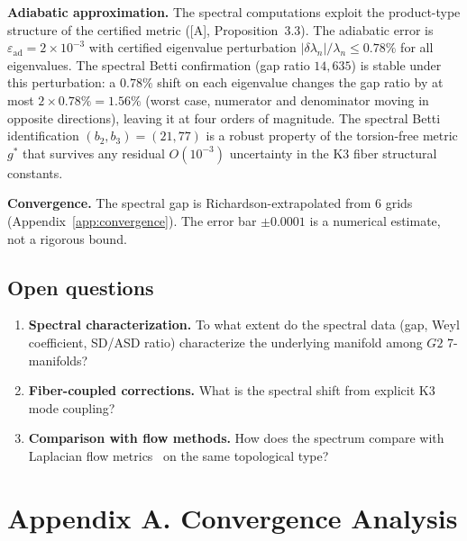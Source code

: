 \documentclass[11pt,a4paper]{article}
\newcommand{\Gtwo}{\mathrm{G}_2}
\def\Gtwo{G2}%
\begin{document}
\textbf{Adiabatic approximation.} The spectral computations exploit the product-type structure of the certified metric ([A], Proposition~3.3). The adiabatic error is $\varepsilon_{\mathrm{ad}} = 2 \times 10^{-3}$ with certified eigenvalue perturbation $|\delta\lambda_n|/\lambda_n \leq 0.78\%$ for all eigenvalues. The spectral Betti confirmation (gap ratio $14{,}635$) is stable under this perturbation: a $0.78\%$ shift on each eigenvalue changes the gap ratio by at most $2 \times 0.78\% = 1.56\%$ (worst case, numerator and denominator moving in opposite directions), leaving it at four orders of magnitude. The spectral Betti identification $(b_2, b_3) = (21, 77)$ is a robust property of the torsion-free metric $g^*$ that survives any residual $O(10^{-3})$ uncertainty in the K3 fiber structural constants.

\textbf{Convergence.} The spectral gap is Richardson-extrapolated from 6 grids (Appendix~\ref{app:convergence}). The error bar $\pm 0.0001$ is a numerical estimate, not a rigorous bound.

\subsection{Open questions}

\begin{enumerate}
\item \textbf{Spectral characterization.} To what extent do the spectral data (gap, Weyl coefficient, SD/ASD ratio) characterize the underlying manifold among $\Gtwo$ 7-manifolds?
\item \textbf{Fiber-coupled corrections.} What is the spectral shift from explicit K3 mode coupling?
\item \textbf{Comparison with flow methods.} How does the spectrum compare with Laplacian flow metrics~\cite{LotayWei2019} on the same topological type?
\end{enumerate}

\section*{Appendix A. Convergence Analysis}\label{app:convergence}
\end{document}
